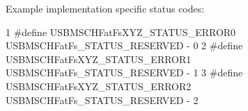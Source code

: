 Example implementation specific status codes\+: 
\begin{DoxyCode}
1 #define USBMSCHFatFsXYZ\_STATUS\_ERROR0        USBMSCHFatFs\_STATUS\_RESERVED - 0
2 #define USBMSCHFatFsXYZ\_STATUS\_ERROR1        USBMSCHFatFs\_STATUS\_RESERVED - 1
3 #define USBMSCHFatFsXYZ\_STATUS\_ERROR2        USBMSCHFatFs\_STATUS\_RESERVED - 2
\end{DoxyCode}
 